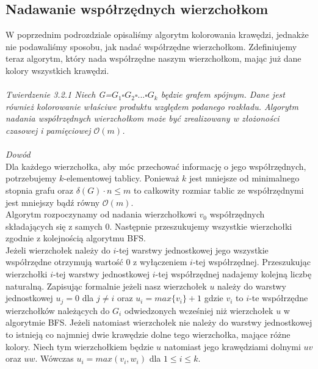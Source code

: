 \documentclass[12pt,a4paper,titlepage]{article}
\begin{document}
\subsection{Nadawanie współrzędnych wierzchołkom}
W poprzednim podrozdziale opisaliśmy algorytm kolorowania krawędzi, jednakże nie podawaliśmy sposobu, jak nadać współrzędne wierzchołkom. Zdefiniujemy teraz algorytm, który nada współrzędne naszym wierzchołkom, mając już dane kolory wszystkich krawędzi.\\
\\
\textit{Twierdzenie 3.2.1 Niech G=$G_1 \square G_2 \square ... \square G_k$ będzie grafem spójnym. Dane jest również kolorowanie właściwe produktu względem podanego rozkładu. Algorytm nadania współrzędnych wierzchołkom może być zrealizowany w złożoności czasowej i pamięciowej $\mathcal{O}(m)$.}\\
\\
\textit{Dowód}\\
Dla każdego wierzchołka, aby móc przechować informację o jego współrzędnych, potrzebujemy $k$-elementowej tablicy. Ponieważ $k$ jest mniejsze od minimalnego stopnia grafu oraz $\delta(G) \cdot n \leqslant m$ to całkowity rozmiar tablic ze współrzędnymi jest mniejszy bądź równy $\mathcal{O}(m)$.\\
Algorytm rozpoczynamy od nadania wierzchołkowi $v_0$ współrzędnych składających się z samych 0. Następnie przeszukujemy wszystkie wierzchołki zgodnie z kolejnością algorytmu BFS. \\Jeżeli wierzchołek należy do $i$-tej warstwy jednostkowej jego wszystkie współrzędne otrzymują wartość 0 z wyłączeniem $i$-tej współrzędnej. Przeszukując wierzchołki $i$-tej warstwy jednostkowej $i$-tej współrzędnej nadajemy kolejną liczbę naturalną. Zapisując formalnie jeżeli nasz wierzchołek $u$ należy do warstwy jednostkowej $u_j =0$ dla $j \neq i$
oraz $u_i = max\{v_i\}+1$ gdzie $v_i $ to $i$-te współrzędne wierzchołków należących do $G_i$ odwiedzonych wcześniej niż wierzchołek $u$ w algorytmie BFS. 
Jeżeli natomiast wierzchołek nie należy do warstwy jednostkowej to istnieją co najmniej dwie krawędzie dolne tego wierzchołka, mające różne kolory. Niech tym wierzchołkiem będzie $u$ natomiast jego krawędziami dolnymi $uv$ oraz $uw$. Wówczas $u_i = max(v_i , w_i )$ dla $1 \leqslant i \leqslant k$.
\end{document}
